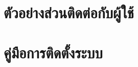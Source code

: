 \documentclass[final]{cskkuproject}
\begin{document}
\chapter{\chapterfivetitle}     %


\printreferences      %

\appendix             %
\chapter{ตัวอย่างส่วนติดต่อกับผู้ใช้}


\chapter{คู่มือการติดตั้งระบบ}


\begin{biography}

\end{biography}
\end{document}
